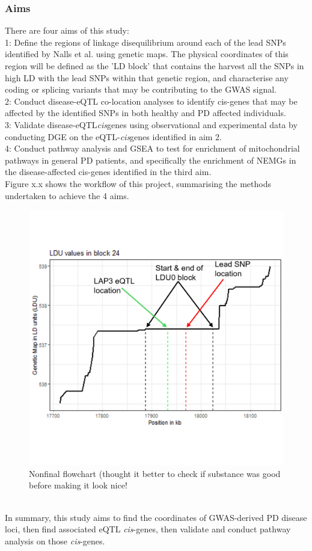 \documentclass{article}
\begin{document}
\subsubsection{Aims}
\label{subsubsec:Aims}
There are four aims of this study:
\\1: Define the regions of linkage disequilibrium around each of the lead SNPs identified by Nalls et al.\cite{Nalls2019IdentificationStudies} using genetic maps. The physical coordinates of this region will be defined as the 'LD block' that contains the harvest all the SNPs in high LD with the lead SNPs within that genetic region, and characterise any coding or splicing variants that may be contributing to the GWAS signal.
\\2: Conduct disease-eQTL co-location analyses to identify cis-genes that may be affected by the identified SNPs in both healthy and PD affected individuals.
\\3: Validate disease-eQTL\textit{cis}genes using observational and experimental data by conducting DGE on the eQTL-\textit{cis}genes identified in aim 2.
\\4: Conduct pathway analysis and GSEA\cite{Subramanian2005GeneProfiles} to test for enrichment of mitochondrial pathways in general PD patients, and specifically the enrichment of NEMGs in the disease-affected cis-genes identified in the third aim.
\\Figure x.x shows the workflow of this project, summarising the methods undertaken to achieve the 4 aims.
\begin{figure}[h]
    \centering
    \includegraphics[width=1\linewidth]{Thesis/thesis images/exampleblock.png}
    \caption{Nonfinal flowchart (thought it better to check if substance was good before making it look nice!}
    \label{fig:enter-label}
\end{figure}
\\In summary, this study aims to find the coordinates of GWAS-derived PD disease loci, then find associated eQTL \textit{cis}-genes, then validate and conduct pathway analysis on those \textit{cis}-genes. 
\newpage
\end{document}
